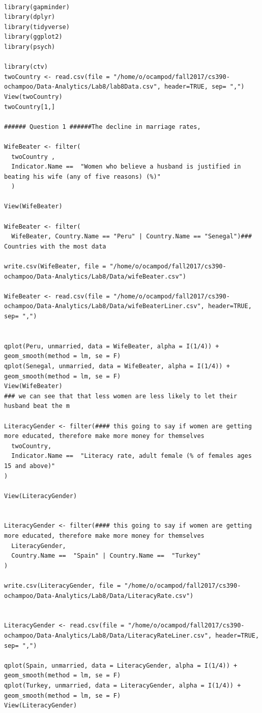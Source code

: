 \documentclass[12pt]{article}
\begin{document}
\begin{lstlisting}

library(gapminder)
library(dplyr)
library(tidyverse)
library(ggplot2)
library(psych)

library(ctv)
twoCountry <- read.csv(file = "/home/o/ocampod/fall2017/cs390-ochampoo/Data-Analytics/Lab8/lab8Data.csv", header=TRUE, sep= ",")
View(twoCountry)
twoCountry[1,]

###### Question 1 ######The decline in marriage rates,

WifeBeater <- filter(
  twoCountry ,
  Indicator.Name ==  "Women who believe a husband is justified in beating his wife (any of five reasons) (%)"
  )

View(WifeBeater)

WifeBeater <- filter(
  WifeBeater, Country.Name == "Peru" | Country.Name == "Senegal")### Countries with the most data

write.csv(WifeBeater, file = "/home/o/ocampod/fall2017/cs390-ochampoo/Data-Analytics/Lab8/Data/wifeBeater.csv")

WifeBeater <- read.csv(file = "/home/o/ocampod/fall2017/cs390-ochampoo/Data-Analytics/Lab8/Data/wifeBeaterLiner.csv", header=TRUE, sep= ",")


qplot(Peru, unmarried, data = WifeBeater, alpha = I(1/4)) + geom_smooth(method = lm, se = F)
qplot(Senegal, unmarried, data = WifeBeater, alpha = I(1/4)) + geom_smooth(method = lm, se = F)
View(WifeBeater)
### we can see that that less women are less likely to let their husband beat the m 

LiteracyGender <- filter(#### this going to say if women are getting more educated, therefore make more money for themselves 
  twoCountry,
  Indicator.Name ==  "Literacy rate, adult female (% of females ages 15 and above)"
)

View(LiteracyGender)


LiteracyGender <- filter(#### this going to say if women are getting more educated, therefore make more money for themselves 
  LiteracyGender,
  Country.Name ==  "Spain" | Country.Name ==  "Turkey" 
)

write.csv(LiteracyGender, file = "/home/o/ocampod/fall2017/cs390-ochampoo/Data-Analytics/Lab8/Data/LiteracyRate.csv")


LiteracyGender <- read.csv(file = "/home/o/ocampod/fall2017/cs390-ochampoo/Data-Analytics/Lab8/Data/LiteracyRateLiner.csv", header=TRUE, sep= ",")

qplot(Spain, unmarried, data = LiteracyGender, alpha = I(1/4)) + geom_smooth(method = lm, se = F)
qplot(Turkey, unmarried, data = LiteracyGender, alpha = I(1/4)) + geom_smooth(method = lm, se = F)
View(LiteracyGender)




\end{lstlisting}
\end{document}
